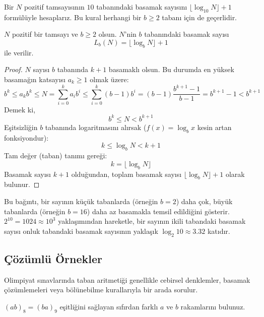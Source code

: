 Bir $N$ pozitif tamsayısının $10$ tabanındaki basamak sayısını $\lfloor \log_{10} N \rfloor + 1$ formülüyle hesaplarız. Bu kural herhangi bir $b \ge 2$ tabanı için de geçerlidir.

\begin{theorem}
$N$ pozitif bir tamsayı ve $b \ge 2$ olsun. $N$'nin $b$ tabanındaki basamak sayısı
\[
L_b(N) = \lfloor \log_b N \rfloor + 1
\]
ile verilir.
\end{theorem}

\begin{proof}
$N$ sayısı $b$ tabanında $k+1$ basamaklı olsun. Bu durumda en yüksek basamağın katsayısı $a_k \ge 1$ olmak üzere:
\[
b^k \le a_k b^k \le N = \sum_{i=0}^k a_i b^i \le \sum_{i=0}^k (b-1) b^i = (b-1) \frac{b^{k+1}-1}{b-1} = b^{k+1} - 1 < b^{k+1}
\]
Demek ki,
\[
b^k \le N < b^{k+1}
\]
Eşitsizliğin $b$ tabanında logaritmasını alırsak ($f(x) = \log_b x$ kesin artan fonksiyondur):
\[
k \le \log_b N < k + 1
\]
Tam değer (taban) tanımı gereği:
\[
k = \lfloor \log_b N \rfloor
\]
Basamak sayısı $k+1$ olduğundan, toplam basamak sayısı $\lfloor \log_b N \rfloor + 1$ olarak bulunur.
\end{proof}

Bu bağıntı, bir sayının küçük tabanlarda (örneğin $b=2$) daha çok, büyük tabanlarda (örneğin $b=16$) daha az basamakla temsil edildiğini gösterir. $2^{10} = 1024 \approx 10^3$ yaklaşımından hareketle, bir sayının ikili tabandaki basamak sayısı onluk tabandaki basamak sayısının yaklaşık $\log_2 10 \approx 3.32$ katıdır.

\subsection{Çözümlü Örnekler}

Olimpiyat sınavlarında taban aritmetiği genellikle cebirsel denklemler, basamak çözümlemeleri veya bölünebilme kurallarıyla bir arada sorulur.

\begin{example}
$(ab)_8 = (ba)_9$ eşitliğini sağlayan sıfırdan farklı $a$ ve $b$ rakamlarını bulunuz.
\end{example}

